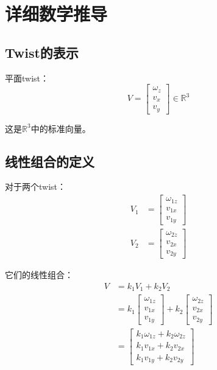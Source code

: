 \documentclass[12pt,a4paper]{article}
\begin{document}
\section{详细数学推导}

\subsection{Twist的表示}

平面twist：
\begin{equation}
V = \begin{bmatrix} \omega_z \\ v_x \\ v_y \end{bmatrix} \in \mathbb{R}^3
\end{equation}

这是$\mathbb{R}^3$中的标准向量。

\subsection{线性组合的定义}

对于两个twist：
\begin{align}
V_1 &= \begin{bmatrix} \omega_{1z} \\ v_{1x} \\ v_{1y} \end{bmatrix} \\
V_2 &= \begin{bmatrix} \omega_{2z} \\ v_{2x} \\ v_{2y} \end{bmatrix}
\end{align}

它们的线性组合：
\begin{align}
V &= k_1 V_1 + k_2 V_2 \\
&= k_1 \begin{bmatrix} \omega_{1z} \\ v_{1x} \\ v_{1y} \end{bmatrix} + k_2 \begin{bmatrix} \omega_{2z} \\ v_{2x} \\ v_{2y} \end{bmatrix} \\
&= \begin{bmatrix} k_1 \omega_{1z} + k_2 \omega_{2z} \\ k_1 v_{1x} + k_2 v_{2x} \\ k_1 v_{1y} + k_2 v_{2y} \end{bmatrix}
\end{align}
\end{document}
